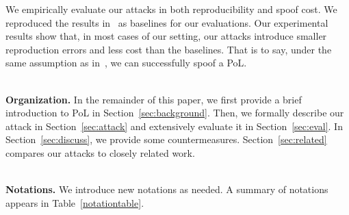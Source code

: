 \documentclass[conference]{IEEEtran}
\newcommand{\Paragraph}[1]{~\vspace*{-0.8\baselineskip}\\{\bf #1}}
\begin{document}
We empirically {evaluate\EndAccSupp{}} our {attacks\EndAccSupp{}} in both reproducibility and {spoof\EndAccSupp{}} cost.
We reproduced the {results\EndAccSupp{}} in~\cite{PoL} as {baselines\EndAccSupp{}} for our evaluations.
Our experimental results show that, in most cases of our setting, our {attacks\EndAccSupp{}} {introduce\EndAccSupp{}} smaller {reproduction\EndAccSupp{}} {errors\EndAccSupp{}} and less cost than the baselines.
That is to say, under the same assumption as in~\cite{PoL}, we can {successfully\EndAccSupp{}} {spoof\EndAccSupp{}} a PoL.

\Paragraph{Organization.}
In the remainder of this paper, we first provide a brief introduction to PoL in Section~\ref{sec:background}.
Then, we formally describe our {attack\EndAccSupp{}} in Section~\ref{sec:attack} and extensively evaluate it in Section~\ref{sec:eval}.
In Section~\ref{sec:discuss}, we provide some countermeasures. 
Section~\ref{sec:related} {compares\EndAccSupp{}} our {attacks\EndAccSupp{}} to closely related work.

\Paragraph{Notations.} We introduce new notations as needed. 
A summary of notations appears in Table~\ref{notationtable}.
\end{document}
